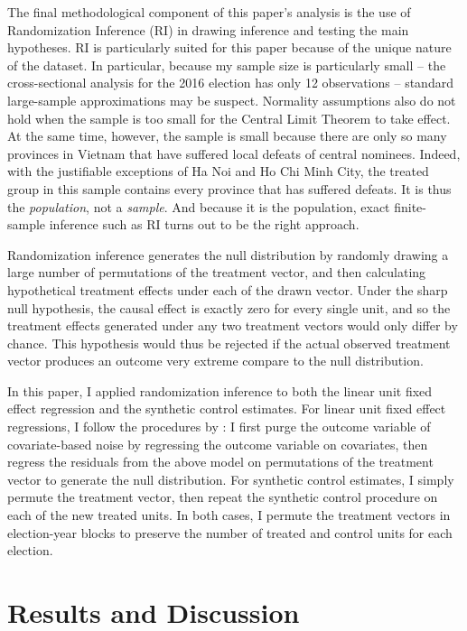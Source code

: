 \documentclass[12pt]{article}\usepackage[]{graphicx}\usepackage[]{color}
\newcommand{\1}{\mathbbm{1}}
\begin{document}
The final methodological component of this paper's analysis is the use of Randomization Inference (RI) in drawing inference and testing the main hypotheses. RI is particularly suited for this paper because of the unique nature of the dataset. In particular, because my sample size is particularly small -- the cross-sectional analysis for the 2016 election has only 12 observations -- standard large-sample approximations may be suspect. Normality assumptions also do not hold when the sample is too small for the Central Limit Theorem to take effect. At the same time, however, the sample is small because there are only so many provinces in Vietnam that have suffered local defeats of central nominees. Indeed, with the justifiable exceptions of Ha Noi and Ho Chi Minh City, the treated group in this sample contains every province that has suffered defeats. It is thus the \textit{population}, not a \textit{sample}. And because it is the population, exact finite-sample inference such as RI turns out to be the right approach. 

Randomization inference generates the null distribution by randomly drawing a large number of permutations of the treatment vector, and then calculating hypothetical treatment effects under each of the drawn vector. Under the sharp null hypothesis, the causal effect is exactly zero for every single unit, and so the treatment effects generated under any two treatment vectors would only differ by chance. This hypothesis would thus be rejected if the actual observed treatment vector produces an outcome very extreme compare to the null distribution.

In this paper, I applied randomization inference to both the linear unit fixed effect regression and the synthetic control estimates. For linear unit fixed effect regressions, I follow the procedures by \cite{BowersPanagopoulous2011}: I first purge the outcome variable of covariate-based noise by regressing the outcome variable on covariates, then regress the residuals from the above model on permutations of the treatment vector to generate the null distribution. For synthetic control estimates, I simply permute the treatment vector, then repeat the synthetic control procedure on each of the new treated units. In both cases, I permute the treatment vectors in election-year blocks to preserve the number of treated and control units for each election. 

\section{Results and Discussion}
\label{sec:results}
\end{document}
